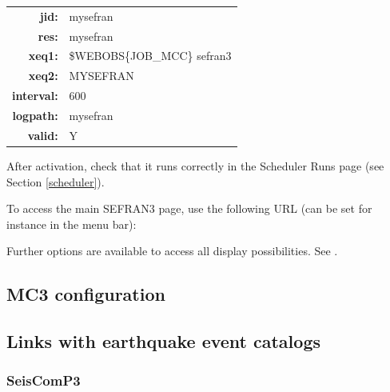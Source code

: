 \begin{tabular}{rl}
\textbf{jid:}      & mysefran \\
\textbf{res:}      & mysefran \\
\textbf{xeq1:}     & \$WEBOBS\{JOB\_MCC\} sefran3 \\
\textbf{xeq2:}     & MYSEFRAN \\
\textbf{interval:} & 600 \\
\textbf{logpath:}  & mysefran \\
\textbf{valid:}    & Y \\
\end{tabular}

After activation, check that it runs correctly in the Scheduler Runs page (see Section \ref{scheduler}).

To access the main SEFRAN3 page, use the following URL (can be set for instance in the menu bar):


Further options are available to access all display possibilities. See .


\subsection{MC3 configuration}





%






\subsection{Links with earthquake event catalogs}

\subsubsection{SeisComP3}

